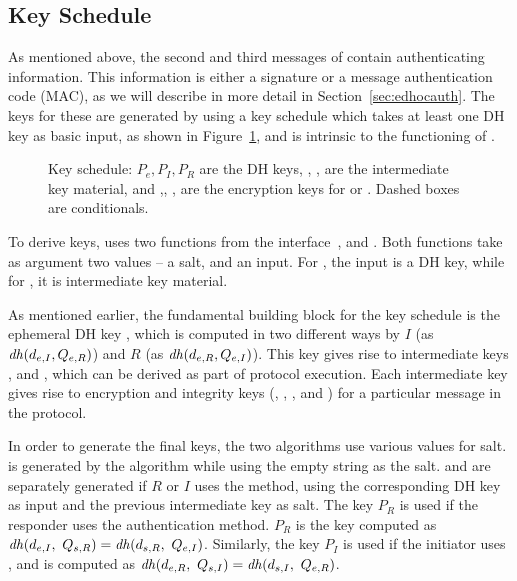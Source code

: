 \subsection{Key Schedule}
\label{sec:keysched}
As mentioned above, the second and third messages of \mEdhoc{} contain
authenticating information.
%
This information is either a signature or a message authentication code (MAC),
as we will describe in more detail in Section~\ref{sec:edhocauth}.
%
The keys for these are generated by using a key schedule which takes at least
one DH key \mGxy{} as basic input, as shown in Figure~\ref{fig:kdfdiagram},
and is intrinsic to the functioning of \mEdhoc{}.
%
\begin{figure}[!h]
\scalebox{.785}{

}
\caption{Key schedule: $P_e, P_I, P_R$ are the DH keys, \mPRKtwo, \mPRKthree, \mPRKfour{} are the intermediate key material, and \mKtwoe,\mKtwom, \mKthreeae, \mKthreem{} are the encryption keys for \mAead{} or \mXor{}. Dashed boxes are conditionals.~\cite{Norr21}}
\label{fig:kdfdiagram}
\end{figure}
%

To derive keys, \mEdhoc{} uses two functions from the \mHkdf{}
interface~\cite{rfc5869}, \mHkdfExtract{} and \mHkdfExpand{}.
%
Both functions take as argument two values -- a salt, and an input.
%
For \mHkdfExtract{}, the input is a DH key, while for \mHkdfExpand{},
it is intermediate key material.
%

As mentioned earlier, the fundamental building block for the key schedule is
the ephemeral DH key \mGxy{}, which is computed in two different ways by
$I$ (as $\mathit{dh}(d_{e,I}, Q_{e,R})$) and $R$ (as $\mathit{dh}(d_{e,R}, Q_{e,I})$).
%
This key gives rise to intermediate keys \mPRKtwo{}, \mPRKthree{} and
\mPRKfour{}, which can be derived as part of protocol execution.
%
Each intermediate key gives rise to encryption and integrity keys
(\mKtwoe, \mKtwom{}, \mKthreeae, and \mKthreem)
for a particular message in the protocol.
%

In order to generate the final keys, the two \mHkdf{} algorithms use various
values for salt.
%
\mPRKtwo{} is generated by the \mHkdfExtract{} algorithm while using the empty
string as the salt.
%
\mPRKthree{} and \mPRKfour{} are separately generated if $R$ or $I$ uses the
\mStat{} method, using the corresponding DH key as input and the previous
intermediate key as salt.
%
The key $P_{R}$ is used if the responder uses the \mStat{} authentication method.
%
$P_{R}$ is the key computed as $\mathit{dh}(d_{e,I},\ Q_{s,R}{}) = \mathit{dh}(d_{s,R},\ Q_{e,I})$.
%
Similarly, the key $P_{I}$ is used if the initiator uses \mStat{}, and is computed as $\mDH(\mY,\ \mGi{}) = \mDH(\mPriv{I},\ \mGy)$.
%

